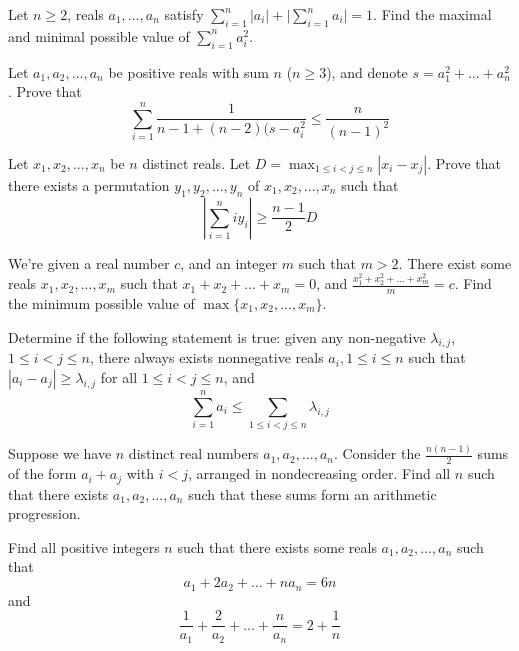  {Let $n\ge 2$, reals $a_1,...,a_n$ satisfy $\sum_{i=1}^n |a_i| + \lvert \sum_{i=1}^n a_i\rvert = 1$. Find the maximal and minimal possible value of $\sum_{i=1}^n a_i^2$.}

 {Let $a_1,a_2,...,a_n$ be positive reals with sum $n$ ($n\ge 3$), and denote $s=a_1^2+...+a_n^2$. Prove that $$\sum_{i=1}^n \frac{1}{n-1+(n-2)(s-a_i^2} \le \frac{n}{(n-1)^2}$$}

 {Let $x_1,x_2,...,x_n$ be $n$ distinct reals. Let $D=\max_{1\le i<j\le n} |x_i-x_j|$. Prove that there exists a permutation $y_1,y_2,...,y_n$ of $x_1,x_2,...,x_n$ such that $$\left\lvert \sum_{i=1}^n iy_i \right\rvert \ge \frac{n-1}{2}D $$}

 {We're given a real number $c$, and an integer $m$ such that $m>2$. There exist some reals $x_1, x_2, ..., x_m$ such that $x_1 + x_2 + ... + x_m = 0$, and $\frac{x_1^2+x_2^2+...+x_m^2}m=c$. Find the minimum possible value of $\max\{x_1,x_2,...,x_m\}$.}

 {Determine if the following statement is true: given any non-negative $\lambda_{i,j}$, $1\le i<j\le n$, there always exists nonnegative reals $a_i, 1\le i\le n$ such that $|a_i-a_j|\ge \lambda_{i,j}$ for all $1\le i<j\le n$, and $$\sum_{i=1}^n a_i\le \sum_{1\le i<j\le n}\lambda_{i,j}$$}




 {Suppose we have $n$ distinct real numbers $a_1, a_2,..., a_n$. Consider the $\frac{n(n-1)}{2}$ sums of the form $a_i + a_j$ with $i<j$, arranged in nondecreasing order. Find all $n$ such that there exists $a_1, a_2, ..., a_n$ such that these sums form an arithmetic progression.}

 {Find all positive integers $n$ such that there exists some reals $a_1, a_2, ..., a_n$ such that
    \[a_1 + 2a_2 + ... + na_n = 6n\]
    and
    \[\frac1{a_1}+\frac2{a_2}+...+\frac{n}{a_n}=2+\frac1n\]}



